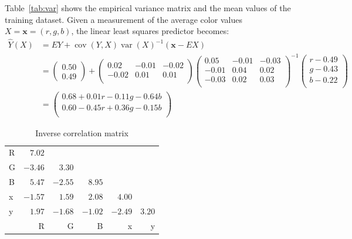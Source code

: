 \documentclass{article}
\DeclareMathOperator{\cov}{cov}
\DeclareMathOperator{\var}{var}
\begin{document}
Table~\ref{tab:var} shows the empirical variance matrix and the mean
values of the training dataset.  Given a measurement of the average
color values $X = \textbf{x} = (r, g, b)$, the linear least squares
predictor becomes:
\begin{align*}
  \hat{Y}(X) & = EY + \cov(Y, X)\var(X)^{-1}(\textbf{x}-EX) \\
  & =
          \begin{pmatrix}
            0.50\\
            0.49
          \end{pmatrix} +
  \begin{pmatrix}
    0.02  & -0.01 & -0.02                      \\
    -0.02 & 0.01  & 0.01                       \\
  \end{pmatrix}
  \begin{pmatrix}
    0.05 & -0.01 & -0.03\\
    -0.01 & 0.04 & 0.02\\
    -0.03 & 0.02 & 0.03\\
  \end{pmatrix}^{-1}
  \begin{pmatrix}
    r - 0.49\\
    g - 0.43\\
    b - 0.22\\
  \end{pmatrix}\\
& =
\begin{pmatrix}
  0.68 + 0.01r - 0.11g - 0.64b\\
  0.60 - 0.45r + 0.36g - 0.15b\\
\end{pmatrix}
\end{align*}
\begin{table}[h] \centering 
\begin{tabular}{l|rrrrr} 
R & $7.02$  &         &         &         &        \\ 
G & $-3.46$ & $3.30$  &         &         &        \\ 
B & $5.47$  & $-2.55$ & $8.95$  &         &        \\ 
x & $-1.57$ & $1.59$  & $2.08$  & $4.00$  &        \\ 
y & $1.97$  & $-1.68$ & $-1.02$ & $-2.49$ & $3.20$ \\ 
\midrule
  & R       & G       & B       & x       & y      \\ 
\end{tabular} 
\caption{Inverse correlation matrix}
\label{tab:invcor}
\end{table} 
\end{document}
